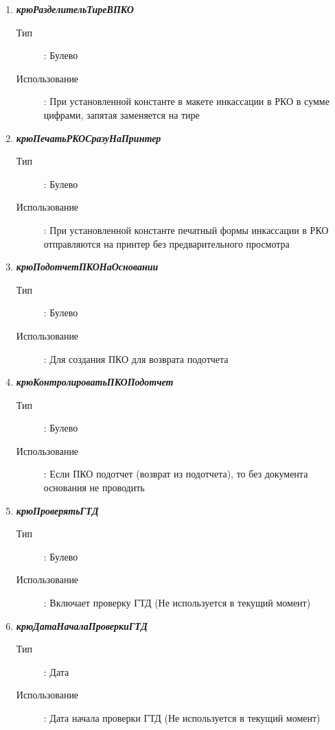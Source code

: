 \begin{enumerate}[label=(\arabic*)]
\vspace{\baselineskip}
\item \textbf{\textit{крюРазделительТиреВПКО}}
\begin{description}
    \item[Тип] : Булево
    \item[Использование]: При установленной константе в макете инкассации в РКО в сумме цифрами, запятая заменяется на тире
\end{description}


\vspace{\baselineskip}
\item \textbf{\textit{крюПечатьРКОСразуНаПринтер}}
\begin{description}
    \item[Тип] : Булево
    \item[Использование]: При установленной константе печатный формы инкассации в РКО отправляются на принтер без предварительного просмотра
\end{description}

\vspace{\baselineskip}
\item \textbf{\textit{крюПодотчетПКОНаОсновании}}
\begin{description}
    \item[Тип] : Булево
    \item[Использование]: Для создания ПКО для возврата подотчета
\end{description}


\vspace{\baselineskip}
\item \textbf{\textit{крюКонтролироватьПКОПодотчет}}
\begin{description}
    \item[Тип] : Булево
    \item[Использование]: Если ПКО подотчет (возврат из подотчета), то без документа основания не проводить
\end{description}


\vspace{\baselineskip}
\item \textbf{\textit{крюПроверятьГТД}}
\begin{description}
    \item[Тип] : Булево
    \item[Использование]: Включает проверку ГТД (Не используется в текущий момент)
\end{description}

\vspace{\baselineskip}
\item \textbf{\textit{крюДатаНачалаПроверкиГТД}}
\begin{description}
    \item[Тип] : Дата
    \item[Использование]: Дата начала проверки ГТД (Не используется в текущий момент)
\end{description}


\end{enumerate}
